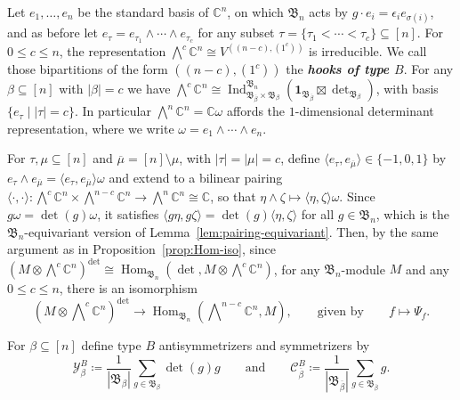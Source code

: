 \documentclass[11pt, reqno]{amsart}
\theoremstyle{definition}
\theoremstyle{remark}
\numberwithin{equation}{section}
\newcommand{\0}{\emptyset}
\newcommand{\C}{\mathbb{C}}
\newcommand{\cC}{\mathcal{C}}
\newcommand{\cY}{\mathcal{Y}}
\DeclareMathOperator{\Hom}{Hom}
\DeclareMathOperator{\Ind}{Ind}
\newcommand{\newword}[1]{\emph{\textbf{#1}}}
\begin{document}
Let $e_1, \ldots, e_n$ be the standard basis of $\C^n$, on which $\mathfrak{B}_n$ acts by $g \cdot e_i = \epsilon_i e_{\sigma(i)}$, and as before let $e_\tau = e_{\tau_1} \wedge \cdots \wedge e_{\tau_c}$ for any subset $\tau = \{ \tau_1 < \cdots <  \tau_c \} \subseteq [n]$. For $0 \leq c \leq n$, the representation $\bigwedge^c \C^n \cong V^{((n-c),(1^c))}$ is irreducible. 
We call those bipartitions of the form $((n-c),(1^c))$ the \newword{hooks of type $B$}.
For any $\beta \subseteq [n]$ with $|\beta| = c$ we have 
$\bigwedge^c \C^n \cong 
\Ind_{\mathfrak{B}_{\overline{\beta}} \times \mathfrak{B}_\beta}^{\mathfrak{B}_n} 
\left(\mathbf{1}_{\mathfrak{B}_{\overline{\beta}}} \boxtimes \det_{\mathfrak{B}_\beta}\right)$, 
with basis $\{ e_\tau \mid |\tau| = c\}$. 
In particular $\bigwedge^n \C^n = \C \omega$ affords the $1$-dimensional determinant representation, where we write $\omega = e_1 \wedge \cdots \wedge e_n$.

For $\tau, \mu \subseteq [n]$ and $\overline{\mu}=[n]\setminus \mu$, with $|\tau| = |\mu| = c$, define $ \langle e_\tau, e_{\overline{\mu}}\rangle \in \{-1,0,1\}$ by $e_\tau \wedge e_{\overline{\mu}} = \langle e_\tau, e_{\overline{\mu}}\rangle \omega$ 
and extend to a  bilinear pairing $\langle \cdot, \cdot \rangle: \bigwedge^c \C^n \times \bigwedge^{n-c} \C^n \to \bigwedge^n \C^n \cong \C$, so that $\eta \wedge \zeta \mapsto \langle \eta, \zeta \rangle \omega$. 
Since $g \omega = \det(g) \omega$, it satisfies $\langle g \eta, g \zeta\rangle = \det(g) \langle \eta, \zeta\rangle$ for all $g \in \mathfrak{B}_n$, which is the $\mathfrak{B}_n$-equivariant version of Lemma~\ref{lem:pairing-equivariant}.
Then, by the same argument as in Proposition~\ref{prop:Hom-iso}, since
$\left( M \otimes \bigwedge\nolimits^c \C^n \right)^{\det} \cong 
\Hom_{\mathfrak{B}_n} \left(\det, M \otimes \bigwedge\nolimits^c \C^n\right)$, 
for any $\mathfrak{B}_n$-module $M$ and any $0 \leq c \leq n$, there is an isomorphism
\begin{equation}\label{eq:Hom-iso-B}
   \left( M \otimes \bigwedge\nolimits^c \C^n\right)^{\det} 
    \to \Hom_{\mathfrak{B}_n} \left(\bigwedge\nolimits^{n-c} \C^n, M\right), 
    \qquad \text{given by} \qquad f \mapsto \Psi_{f}.
\end{equation}

For $\beta \subseteq [n]$ define type $B$ antisymmetrizers and symmetrizers by
\begin{equation*}
    \cY^B_\beta \coloneqq \frac{1}{|\mathfrak{B}_\beta|} 
    \sum_{g \in \mathfrak{B}_\beta} \det(g) g 
    \qquad \text{and} \qquad 
    \cC^B_{\overline{\beta}} \coloneqq 
    \frac{1}{|\mathfrak{B}_{\overline{\beta}}|} \sum_{g \in \mathfrak{B}_{\overline{\beta}}} g.
\end{equation*}
\end{document}
